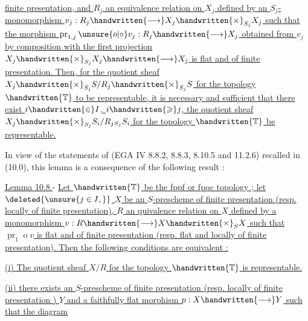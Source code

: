 \uline{finite presentation, and $R_j$ an equivalence relation on $X_j$ defined by an $S_j$-monomorphism $v_j:R_j\handwritten{\longrightarrow}X_j\handwritten{\times}_{S_j}X_j$ such that the morphism $\operatorname{pr}_{1,j}\mathbin{\unsure{o|\circ}} v_j:R_j\handwritten{\longrightarrow}X_j$ obtained from $v_j$ by composition with the first projection $X_j\handwritten{\times}_{S_j}X_j\handwritten{\longrightarrow}X_j$ is flat and of finite presentation. Then, for the quotient sheaf $X_j\handwritten{\times}_{S_j}S/R_j\handwritten{\times}_{S_j}S$ for the topology $\handwritten{\mathbb{T}}$ to be representable, it is necessary and sufficient that there exist $i\handwritten{\in}I$, $i\handwritten{\geqslant}j$, the quotient sheaf $X_j\handwritten{\times}_{S_j}S_i/R_j{}_{S_j}S_i$ for the topology $\handwritten{\mathbb{T}}$ be representable.}

In view of the statements of (EGA IV 8.8.2, 8.8.3, 8.10.5 and 11.2.6) recalled in (10.0), this lemma is a consequence of the following result :

\uline{Lemma 10.8.}- \uline{Let $\handwritten{\mathbb{T}}$ be the fppf or fpqc topology ; let $\deleted{\unsure{j\in I,}}$ $X$ be an $S$-prescheme of finite presentation (resp. locally of finite presentation), $R$ an quivalence relation on $X$ defined by a monomorphism $v:R\handwritten{\longrightarrow}X\handwritten{\times}_S X$ such that $\operatorname{pr}_1\mathbin{o} v$ is flat and of finite presentation (resp. flat and locally of finite presentation). Then the following conditions are equivalent :}

\uline{(i) The quotient sheaf $X/R$ for the topology $\handwritten{\mathbb{T}}$ is representable.}

\uline{(ii) there exists an $S$-prescheme of finite presentation (resp. locally of finite presentation ) $Y$ and a faithfully flat morphism $p:X\handwritten{\longrightarrow}Y$ such that the diagram}


